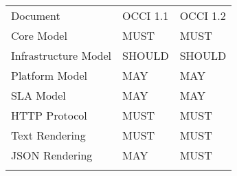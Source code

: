 {
	\begin{tabular}{lll}
	\toprule
	Document & OCCI 1.1 & OCCI 1.2 \\
	\colrule
	Core Model & MUST & MUST \\
	Infrastructure Model  & SHOULD & SHOULD \\
	Platform Model & MAY & MAY \\
	SLA Model & MAY & MAY \\
	HTTP Protocol & MUST & MUST \\
	Text Rendering& MUST & MUST \\
	JSON Rendering& MAY & MUST \\
	\botrule
	\end{tabular}
}

